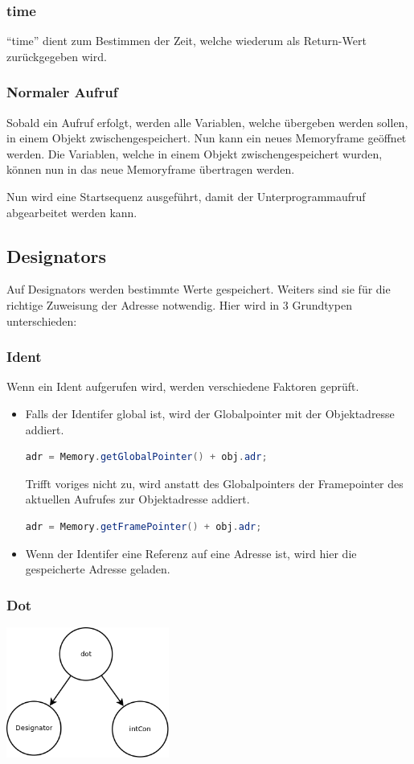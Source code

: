 \subsubsection{time}
``time'' dient zum Bestimmen der Zeit, welche wiederum als Return-Wert zurückgegeben wird.

\subsubsection{Normaler Aufruf}
Sobald ein Aufruf erfolgt, werden alle Variablen, welche übergeben werden sollen, in einem Objekt zwischengespeichert. Nun kann ein
neues Memoryframe geöffnet werden. Die Variablen, welche in einem Objekt zwischengespeichert wurden, können nun in das neue
Memoryframe übertragen werden.

Nun wird eine Startsequenz ausgeführt, damit der Unterprogrammaufruf abgearbeitet werden kann.

\subsection{Designators}
Auf Designators werden bestimmte Werte gespeichert. Weiters sind sie für die richtige Zuweisung der Adresse notwendig.
Hier wird in 3 Grundtypen unterschieden:

\subsubsection{Ident}
Wenn ein Ident aufgerufen wird, werden verschiedene Faktoren geprüft.
\begin{itemize}
 \item Falls der Identifer global ist, wird der Globalpointer mit der Objektadresse addiert.
 \begin{lstlisting}[language=JAVA]
 adr = Memory.getGlobalPointer() + obj.adr;	
  \end{lstlisting}
  Trifft voriges nicht zu, wird anstatt des Globalpointers der Framepointer des aktuellen Aufrufes zur Objektadresse addiert.
   \begin{lstlisting}[language=JAVA]
 adr = Memory.getFramePointer() + obj.adr;
  \end{lstlisting}
 \item Wenn der Identifer eine Referenz auf eine Adresse ist, wird hier die gespeicherte Adresse geladen.
\end{itemize}



\subsubsection{Dot}
\includegraphics[width=0.4\textwidth]{./media/images/interpreter/syntaxbaum/designators/dot.png}

